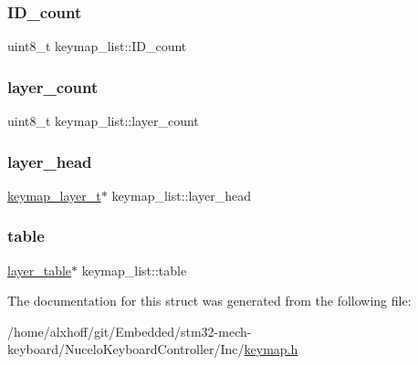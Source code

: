 \subsubsection{\texorpdfstring{I\+D\+\_\+count}{ID\_count}}
{\footnotesize\ttfamily uint8\+\_\+t keymap\+\_\+list\+::\+I\+D\+\_\+count}

\mbox{\label{structkeymap__list_a1dec5b93f480c7759713e01d9019e121}} 
\subsubsection{\texorpdfstring{layer\+\_\+count}{layer\_count}}
{\footnotesize\ttfamily uint8\+\_\+t keymap\+\_\+list\+::layer\+\_\+count}

\mbox{\label{structkeymap__list_ab28e9ca3fa7f418768c57d5c7633d490}} 
\subsubsection{\texorpdfstring{layer\+\_\+head}{layer\_head}}
{\footnotesize\ttfamily \hyperlink{keymap_8h_a09117a6f418904d4009f63e96c2b9b92}{keymap\+\_\+layer\+\_\+t}$\ast$ keymap\+\_\+list\+::layer\+\_\+head}

\mbox{\label{structkeymap__list_a5b916d759e7d6e03863eb72593988747}} 
\subsubsection{\texorpdfstring{table}{table}}
{\footnotesize\ttfamily \hyperlink{structlayer__table}{layer\+\_\+table}$\ast$ keymap\+\_\+list\+::table}



The documentation for this struct was generated from the following file\+:\begin{DoxyCompactItemize}
\item 
/home/alxhoff/git/\+Embedded/stm32-\/mech-\/keyboard/\+Nucelo\+Keyboard\+Controller/\+Inc/\hyperlink{keymap_8h}{keymap.\+h}\end{DoxyCompactItemize}
